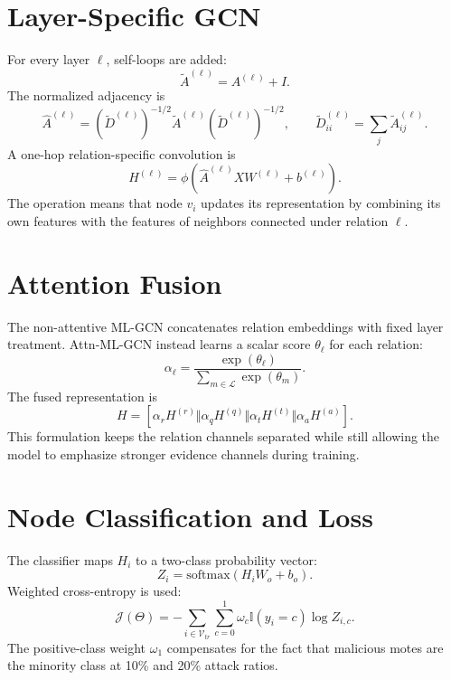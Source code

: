 \documentclass[10pt]{article}
\begin{document}
\section{Layer-Specific GCN}
For every layer $\ell$, self-loops are added:
\begin{equation}
\tilde{A}^{(\ell)}=A^{(\ell)}+I.
\label{eq:app2_self_loop}
\end{equation}
The normalized adjacency is
\begin{equation}
\hat{A}^{(\ell)}=(\tilde{D}^{(\ell)})^{-1/2}
\tilde{A}^{(\ell)}
(\tilde{D}^{(\ell)})^{-1/2},
\qquad
\tilde{D}^{(\ell)}_{ii}=\sum_j \tilde{A}^{(\ell)}_{ij}.
\label{eq:app2_norm}
\end{equation}
A one-hop relation-specific convolution is
\begin{equation}
H^{(\ell)}=\phi(\hat{A}^{(\ell)}XW^{(\ell)}+b^{(\ell)}).
\label{eq:app2_gcn}
\end{equation}
The operation means that node $v_i$ updates its representation by combining its own features with the features of neighbors connected under relation $\ell$.

\section{Attention Fusion}
The non-attentive ML-GCN concatenates relation embeddings with fixed layer treatment. Attn-ML-GCN instead learns a scalar score $\theta_\ell$ for each relation:
\begin{equation}
\alpha_\ell=
\frac{\exp(\theta_\ell)}
{\sum_{m\in\mathcal{L}}\exp(\theta_m)}.
\label{eq:app2_attention}
\end{equation}
The fused representation is
\begin{equation}
H=
[\alpha_rH^{(r)}\Vert
\alpha_qH^{(q)}\Vert
\alpha_tH^{(t)}\Vert
\alpha_aH^{(a)}].
\label{eq:app2_fusion}
\end{equation}
This formulation keeps the relation channels separated while still allowing the model to emphasize stronger evidence channels during training.

\section{Node Classification and Loss}
The classifier maps $H_i$ to a two-class probability vector:
\begin{equation}
Z_i=\mathrm{softmax}(H_iW_o+b_o).
\label{eq:app2_softmax}
\end{equation}
Weighted cross-entropy is used:
\begin{equation}
\mathcal{J}(\Theta)=
-\sum_{i\in\mathcal{V}_{tr}}\sum_{c=0}^{1}
\omega_c\mathbb{I}(y_i=c)\log Z_{i,c}.
\label{eq:app2_loss}
\end{equation}
The positive-class weight $\omega_1$ compensates for the fact that malicious motes are the minority class at 10\% and 20\% attack ratios.
\end{document}
